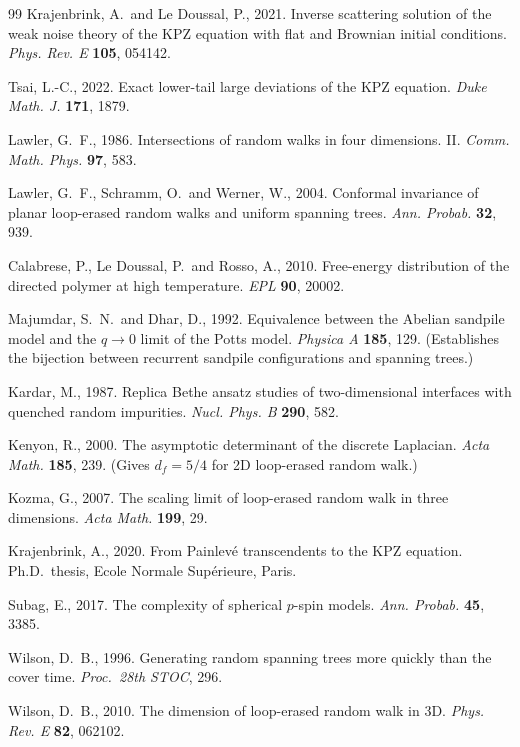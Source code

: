 \documentclass[10pt,a4paper,twocolumn]{article}
\theoremstyle{plain}
\theoremstyle{definition}
\begin{document}
\begin{thebibliography}{99}
  Krajenbrink, A.\ and Le Doussal, P., 2021.
  Inverse scattering solution of the weak noise theory of the KPZ
  equation with flat and Brownian initial conditions.
  \textit{Phys. Rev. E} \textbf{105}, 054142.

  Tsai, L.-C., 2022.
  Exact lower-tail large deviations of the KPZ equation.
  \textit{Duke Math. J.} \textbf{171}, 1879.

  Lawler, G.~F., 1986.
  Intersections of random walks in four dimensions. II.
  \textit{Comm. Math. Phys.} \textbf{97}, 583.

  Lawler, G.~F., Schramm, O.\ and Werner, W., 2004.
  Conformal invariance of planar loop-erased random walks and
  uniform spanning trees.
  \textit{Ann. Probab.} \textbf{32}, 939.

  Calabrese, P., Le Doussal, P.\ and Rosso, A., 2010.
  Free-energy distribution of the directed polymer at high
  temperature.
  \textit{EPL} \textbf{90}, 20002.

  Majumdar, S.~N.\ and Dhar, D., 1992.
  Equivalence between the Abelian sandpile model and the $q \to 0$
  limit of the Potts model.
  \textit{Physica A} \textbf{185}, 129. (Establishes the
  bijection between recurrent sandpile configurations and
  spanning trees.)

  Kardar, M., 1987.
  Replica Bethe ansatz studies of two-dimensional interfaces with
  quenched random impurities.
  \textit{Nucl. Phys. B} \textbf{290}, 582.

  Kenyon, R., 2000.
  The asymptotic determinant of the discrete Laplacian.
  \textit{Acta Math.} \textbf{185}, 239. (Gives
  $d_f = 5/4$ for 2D loop-erased random walk.)

  Kozma, G., 2007.
  The scaling limit of loop-erased random walk in three dimensions.
  \textit{Acta Math.} \textbf{199}, 29.

  Krajenbrink, A., 2020.
  From Painlev\'e transcendents to the KPZ equation.
  Ph.D.\ thesis, Ecole Normale Sup\'erieure, Paris.

  Subag, E., 2017.
  The complexity of spherical $p$-spin models.
  \textit{Ann. Probab.} \textbf{45}, 3385.

  Wilson, D.~B., 1996.
  Generating random spanning trees more quickly than the cover time.
  \textit{Proc.\ 28th STOC}, 296.

  Wilson, D.~B., 2010.
  The dimension of loop-erased random walk in 3D.
  \textit{Phys. Rev. E} \textbf{82}, 062102.

\end{thebibliography}
\end{document}
